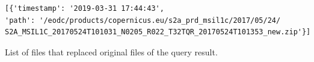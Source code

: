 \documentclass[draft,final]{vutinfth} %
\newenvironment{code}{\captionsetup{type=listing}}{}
\begin{document}
\begin{enumerate}

	\begin{code}
		\begin{verbatim} 
[{'timestamp': '2019-03-31 17:44:43', 
'path': '/eodc/products/copernicus.eu/s2a_prd_msil1c/2017/05/24/
S2A_MSIL1C_20170524T101031_N0205_R022_T32TQR_20170524T101353_new.zip'}]
		\end{verbatim}
		\caption{List of files that replaced original files of the query result.}
		\label{lst:eva_datachange_state}
	\end{code}


\end{enumerate}
\end{document}
